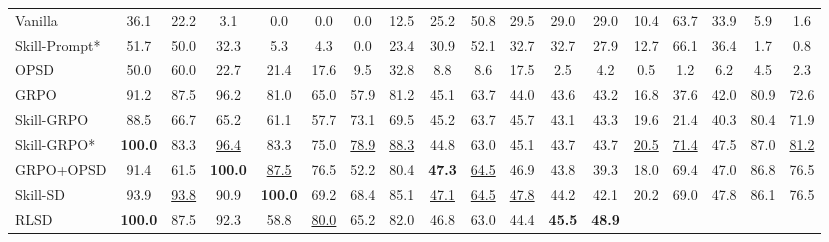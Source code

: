 \begin{table}[ht!]
{\begin{tabular}{l ccccccc cccccccc cc}
    Vanilla
        & 36.1 & 22.2 & 3.1 & 0.0 & 0.0 & 0.0 & 12.5
        & 25.2 & 50.8 & 29.5 & 29.0 & 29.0 & 10.4 & 63.7 & 33.9
        & 5.9 & 1.6
        \\
    Skill-Prompt*
        & 51.7 & 50.0 & 32.3 & 5.3 & 4.3 & 0.0 & 23.4
        & 30.9 & 52.1 & 32.7 & 32.7 & 27.9 & 12.7 & 66.1 & 36.4
        & 1.7 & 0.8
        \\
    OPSD
        & 50.0 & 60.0 & 22.7 & 21.4 & 17.6 & 9.5 & 32.8
        & 8.8 & 8.6 & 17.5 & 2.5 & 4.2 & 0.5 & 1.2 & 6.2
        & 4.5 & 2.3
        \\
    GRPO
        & 91.2 & 87.5 & 96.2 & 81.0 & 65.0 & 57.9 & 81.2
        & 45.1 & 63.7 & 44.0 & 43.6 & 43.2 & 16.8 & 37.6 & 42.0
        & 80.9 & 72.6
        \\
    Skill-GRPO
        & 88.5 & 66.7 & 65.2 & 61.1 & 57.7 & 73.1 & 69.5
        & 45.2 & 63.7 & 45.7 & 43.1 & 43.3 & 19.6 & 21.4 & 40.3
        & 80.4 & 71.9
        \\
    Skill-GRPO*
        & \cellcolor{topcolor}\textbf{100.0}
        & 83.3
        & \cellcolor{secondcolor}\underline{96.4}
        & 83.3 & 75.0
        & \cellcolor{secondcolor}\underline{78.9}
        & \cellcolor{secondcolor}\underline{88.3}
        & 44.8 & 63.0 & 45.1 & 43.7 & 43.7
        & \cellcolor{secondcolor}\underline{20.5}
        & \cellcolor{secondcolor}\underline{71.4}
        & 47.5
        & 87.0
        & \cellcolor{secondcolor}\underline{81.2}
        \\
    GRPO+OPSD
        & 91.4 & 61.5
        & \cellcolor{topcolor}\textbf{100.0}
        & \cellcolor{secondcolor}\underline{87.5}
        & 76.5 & 52.2 & 80.4
        & \cellcolor{topcolor}\textbf{47.3}
        & \cellcolor{secondcolor}\underline{64.5}
        & 46.9 & 43.8 & 39.3 & 18.0 & 69.4 & 47.0
        & 86.8 & 76.5
        \\
    Skill-SD
        & 93.9
        & \cellcolor{secondcolor}\underline{93.8}
        & 90.9
        & \cellcolor{topcolor}\textbf{100.0}
        & 69.2 & 68.4 & 85.1
        & \cellcolor{secondcolor}\underline{47.1}
        & \cellcolor{secondcolor}\underline{64.5}
        & \cellcolor{secondcolor}\underline{47.8}
        & 44.2 & 42.1 & 20.2 & 69.0 & 47.8
        & 86.1 & 76.5
        \\
    RLSD
        & \cellcolor{topcolor}\textbf{100.0}
        & 87.5 & 92.3 & 58.8
        & \cellcolor{secondcolor}\underline{80.0}
        & 65.2 & 82.0
        & 46.8 & 63.0 & 44.4
        & \cellcolor{topcolor}\textbf{45.5}
        & \cellcolor{topcolor}\textbf{48.9}

\end{tabular}}
\end{table}
